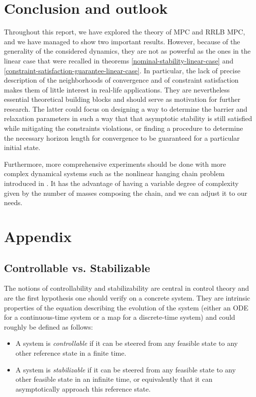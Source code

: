 \documentclass[12pt]{article}
\begin{document}
\section{Conclusion and outlook}

Throughout this report, we have explored the theory of MPC and RRLB MPC, and we have managed to show two important results.
However, because of the generality of the considered dynamics, they are not as powerful as the ones in the linear case that were recalled in theorems \ref{nominal-stability-linear-case} and \ref{constraint-satisfaction-guarantee-linear-case}.
In particular, the lack of precise description of the neighborhoods of convergence and of constraint satisfaction makes them of little interest in real-life applications.
They are nevertheless essential theoretical building blocks and should serve as motivation for further research.
The latter could focus on designing a way to determine the barrier and relaxation parameters in such a way that that asymptotic stability is still satisfied while mitigating the constraints violations, or finding a procedure to determine the necessary horizon length for convergence to be guaranteed for a particular initial state.

Furthermore, more comprehensive experiments should be done with more complex dynamical systems such as the nonlinear hanging chain problem introduced in \cite{hanging-chain}.
It has the advantage of having a variable degree of complexity given by the number of masses composing the chain, and we can adjust it to our needs.


\newpage

\section{Appendix}

\subsection{Controllable vs. Stabilizable}\label{sec:controllability-stabilizability}

The notions of controllability and stabilizability are central in control theory and are the first hypothesis one should verify on a concrete system.
They are intrinsic properties of the equation describing the evolution of the system (either an ODE for a continuous-time system or a map for a discrete-time system) and could roughly be defined as follows:
\begin{itemize}[label=\textbullet]
	\item A system is \textit{controllable} if it can be steered from any feasible state to any other reference state in a finite time.
	\item A system is \textit{stabilizable} if it can be steered from any feasible state to any other feasible state in an infinite time, or equivalently that it can asymptotically approach this reference state.
\end{itemize}
\end{document}
